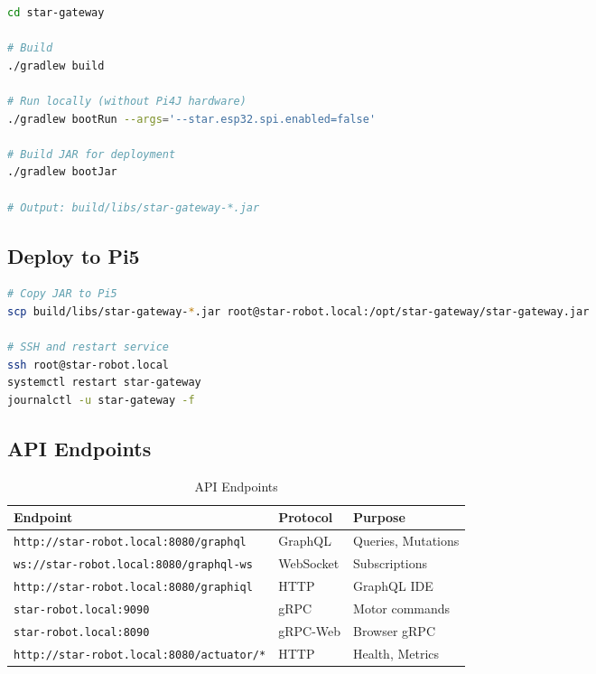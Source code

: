 \documentclass[11pt,letterpaper]{article}
\begin{document}
\begin{lstlisting}[language=bash]
cd star-gateway

# Build
./gradlew build

# Run locally (without Pi4J hardware)
./gradlew bootRun --args='--star.esp32.spi.enabled=false'

# Build JAR for deployment
./gradlew bootJar

# Output: build/libs/star-gateway-*.jar
\end{lstlisting}

\subsection{Deploy to Pi5}

\begin{lstlisting}[language=bash]
# Copy JAR to Pi5
scp build/libs/star-gateway-*.jar root@star-robot.local:/opt/star-gateway/star-gateway.jar

# SSH and restart service
ssh root@star-robot.local
systemctl restart star-gateway
journalctl -u star-gateway -f
\end{lstlisting}

\subsection{API Endpoints}

\begin{table}[H]
\centering
\begin{tabular}{|l|l|l|}
\hline
\textbf{Endpoint} & \textbf{Protocol} & \textbf{Purpose} \\
\hline
\texttt{http://star-robot.local:8080/graphql} & GraphQL & Queries, Mutations \\
\texttt{ws://star-robot.local:8080/graphql-ws} & WebSocket & Subscriptions \\
\texttt{http://star-robot.local:8080/graphiql} & HTTP & GraphQL IDE \\
\texttt{star-robot.local:9090} & gRPC & Motor commands \\
\texttt{star-robot.local:8090} & gRPC-Web & Browser gRPC \\
\texttt{http://star-robot.local:8080/actuator/*} & HTTP & Health, Metrics \\
\hline
\end{tabular}
\caption{API Endpoints}
\end{table}

\end{document}
